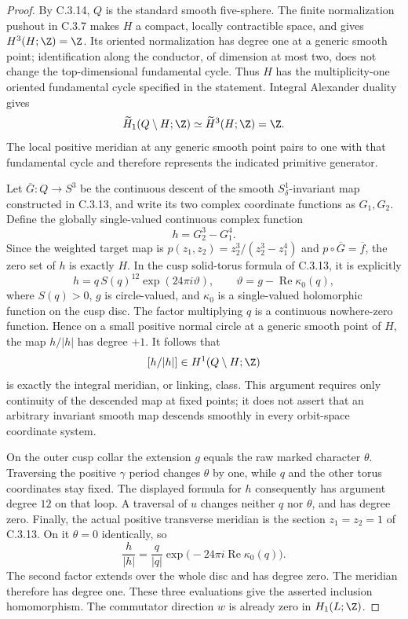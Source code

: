 \begin{proof}
By C.3.14, $Q$ is the standard smooth five-sphere. The finite
normalization pushout in C.3.7 makes $H$ a compact, locally
contractible space, and gives $H^3(H;\Z)=\Z$. Its oriented
normalization has degree one at a generic smooth point; identification
along the conductor, of dimension at most two, does not change the
top-dimensional fundamental cycle. Thus $H$ has the multiplicity-one
oriented fundamental cycle specified in the statement. Integral
Alexander duality gives
\[
 \widetilde H_1(Q\setminus H;\Z)
 \simeq \widetilde H^3(H;\Z)=\Z.
\]
The local positive meridian at any generic smooth point pairs to one
with that fundamental cycle and therefore represents the indicated
primitive generator.

Let $\overline G:Q\to S^3$ be the continuous descent of the smooth
$S^1_\delta$-invariant map constructed in C.3.13, and write its two
complex coordinate functions as $G_1,G_2$. Define the globally
single-valued continuous complex function
\[
 h=G_2^3-G_1^4.
\]
Since the weighted target map is
$p(z_1,z_2)=z_2^3/(z_2^3-z_1^4)$ and
$p\circ\overline G=\overline f$, the zero set of $h$ is exactly $H$.
In the cusp solid-torus formula of C.3.13, it is explicitly
\[
 h=q\,S(q)^{12}\exp(24\pi i\vartheta),\qquad
 \vartheta=g-\operatorname{Re}\kappa_0(q),
\]
where $S(q)>0$, $g$ is circle-valued, and $\kappa_0$ is a
single-valued holomorphic function on the cusp disc. The factor
multiplying $q$ is a continuous nowhere-zero function. Hence on a
small positive normal circle at a generic smooth point of $H$, the
map $h/|h|$ has degree $+1$. It follows that
\[
 [h/|h|]\in H^1(Q\setminus H;\Z)
\]
is exactly the integral meridian, or linking, class. This argument
requires only continuity of the descended map at fixed points; it
does not assert that an arbitrary invariant smooth map descends
smoothly in every orbit-space coordinate system.

On the outer cusp collar the extension $g$ equals the raw marked
character $\theta$. Traversing the positive $\gamma$ period changes
$\theta$ by one, while $q$ and the other torus coordinates stay fixed.
The displayed formula for $h$ consequently has argument degree
$12$ on that loop. A traversal of $u$ changes neither $q$ nor
$\theta$, and has degree zero. Finally, the actual positive
transverse meridian is the section $z_1=z_2=1$ of C.3.13. On it
$\theta=0$ identically, so
\[
 \frac{h}{|h|}
 =\frac{q}{|q|}\exp\bigl(-24\pi i\operatorname{Re}\kappa_0(q)\bigr).
\]
The second factor extends over the whole disc and has degree zero.
The meridian therefore has degree one. These three evaluations give
the asserted inclusion homomorphism. The commutator direction $w$
is already zero in $H_1(L;\Z)$.
\end{proof}

